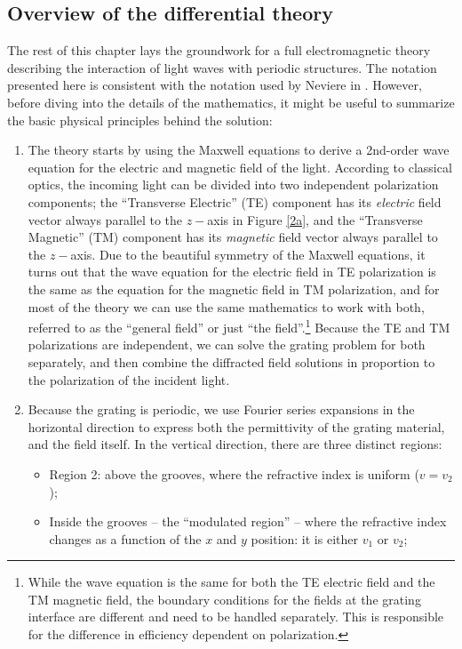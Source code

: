 \subsection{Overview of the differential theory}
The rest of this chapter lays the groundwork for a full electromagnetic theory describing the interaction of light waves with periodic structures.  The notation presented here is consistent with the notation used by Neviere in \cite{Nev02}.  However, before diving into the details of the mathematics, it might be useful to summarize the basic physical principles behind the solution:
  \begin{enumerate}
\item The theory starts by using the Maxwell equations to derive a 2nd-order wave equation for the electric and magnetic field of the light.  According to classical optics, the incoming light can be divided into two independent polarization components; the ``Transverse Electric'' (TE) component has its \emph{electric} field vector always parallel to the $z-$axis in Figure \ref{2a}, and the ``Transverse Magnetic'' (TM) component has its \emph{magnetic} field vector always parallel to the $z-$axis.  Due to the beautiful symmetry of the Maxwell equations, it turns out that the wave equation for the electric field in TE polarization is the same as the equation for the magnetic field in TM polarization, and for most of the theory we can use the same mathematics to work with both, referred to as the ``general field'' or just ``the field''.\footnote{While the wave equation is the same for both the TE electric field and the TM magnetic field, the boundary conditions for the fields at the grating interface are different and need to be handled separately.  This is responsible for the difference in efficiency dependent on polarization.}  Because the TE and TM polarizations are independent, we can solve the grating problem for both separately, and then combine the diffracted field solutions in proportion to the polarization of the incident light.
\item Because the grating is periodic, we use Fourier series expansions in the horizontal direction to express both the permittivity of the grating material, and the field itself. In the vertical direction, there are three distinct regions:
	\begin{itemize}
	\item Region 2: above the grooves, where the refractive index is uniform ($v = v_2$);
	\item Inside the grooves -- the ``modulated region'' -- where the refractive index changes as a function of the $x$ and $y$ position: it is either $v_1$ or $v_2$;

\end{itemize}
\end{enumerate}
